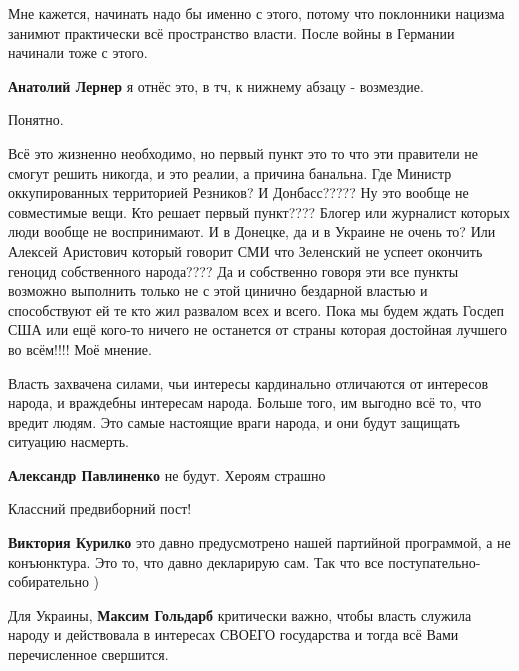 \begin{itemize}
\begin{itemize}

Мне кажется, начинать надо бы именно с этого, потому что поклонники нацизма
занимют практически всё пространство власти. После войны в Германии начинали
тоже с этого.

\textbf{Анатолий Лернер} я отнёс это, в тч, к нижнему абзацу - возмездие.

Понятно.
\end{itemize} %


Всё это жизненно необходимо, но первый пункт это то что эти правители не смогут
решить никогда, и это реалии, а причина банальна. Где Министр оккупированных
территорией Резников? И Донбасс????? Ну это вообще не совместимые вещи. Кто
решает первый пункт???? Блогер или журналист которых люди вообще не
воспринимают. И в Донецке, да и в Украине не очень то? Или Алексей Аристович
который говорит СМИ что Зеленский не успеет окончить геноцид собственного
народа???? Да и собственно говоря эти все пункты возможно выполнить только не с
этой цинично бездарной властью и способствуют ей те кто жил развалом всех и
всего. Пока мы будем ждать Госдеп США или ещё кого-то ничего не останется от
страны которая достойная лучшего во всём!!!! Моё мнение.


Власть захвачена силами, чьи интересы кардинально отличаются от интересов
народа, и враждебны интересам народа. Больше того, им выгодно всё то, что
вредит людям. Это самые настоящие враги народа, и они будут защищать ситуацию
насмерть.

\begin{itemize} %
\textbf{Александр Павлиненко} не будут. Хероям страшно
\end{itemize} %

Классний предвиборний пост!

\begin{itemize} %
\textbf{Виктория Курилко} это давно предусмотрено нашей партийной программой, а не конъюнктура. Это то, что давно декларирую сам. Так что все поступательно-собирательно )
\end{itemize} %


Для Украины, \textbf{Максим Гольдарб} критически важно, чтобы власть служила
народу и действовала в интересах СВОЕГО государства и тогда всё Вами
перечисленное свершится.


\end{itemize}
